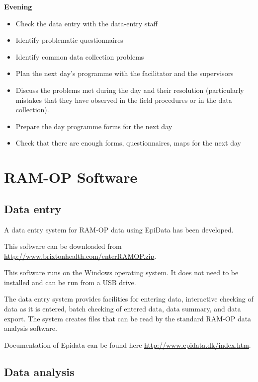 \documentclass[12pt,a4paper]{book}
\providecommand{\tightlist}{%
  \setlength{\itemsep}{0pt}\setlength{\parskip}{0pt}}
\theoremstyle{definition}
\theoremstyle{definition}
\theoremstyle{definition}
\theoremstyle{remark}
\begin{document}
\textbf{Evening}

\begin{itemize}
\tightlist
\item
  Check the data entry with the data-entry staff
\item
  Identify problematic questionnaires
\item
  Identify common data collection problems
\item
  Plan the next day's programme with the facilitator and the supervisors
\item
  Discuss the problems met during the day and their resolution
  (particularly mistakes that they have observed in the field procedures
  or in the data collection).
\item
  Prepare the day programme forms for the next day
\item
  Check that there are enough forms, questionnaires, maps for the next
  day
\end{itemize}

\hypertarget{software}{%
\chapter{RAM-OP Software}\label{software}}

\hypertarget{data-entry}{%
\section{Data entry}\label{data-entry}}

A data entry system for RAM-OP data using EpiData has been developed.

This software can be downloaded from
\url{http://www.brixtonhealth.com/enterRAMOP.zip}.

This software runs on the Windows operating system. It does not need to
be installed and can be run from a USB drive.

The data entry system provides facilities for entering data, interactive
checking of data as it is entered, batch checking of entered data, data
summary, and data export. The system creates files that can be read by
the standard RAM-OP data analysis software.

Documentation of Epidata can be found here
\url{http://www.epidata.dk/index.htm}.

\hypertarget{data-analysis}{%
\section{Data analysis}\label{data-analysis}}
\end{document}
